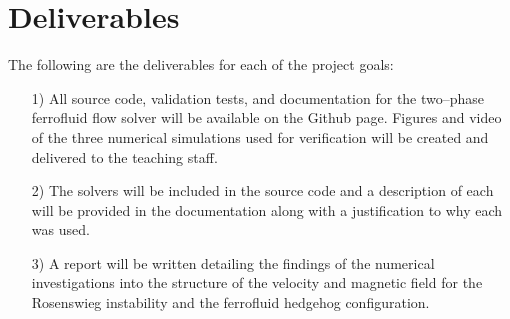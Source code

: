 \documentclass[11pt,fullpage]{article}
\theoremstyle{lemma}
\theoremstyle{definition}
\theoremstyle{lemma}
\begin{document}
\section{Deliverables}
The following are the deliverables for each of the project goals:
\begin{itemize}
	\item[1)] All source code, validation tests, and documentation for the two--phase ferrofluid flow solver will be available on the Github page. Figures and video of the three numerical simulations used for verification will be created and delivered to the teaching staff. 
	
	\item[2)] The solvers will be included in the source code and a description of each will be provided in the documentation along with a justification to why each was used.
	
	\item[3)] A report will be written detailing the findings of the numerical investigations into the structure of the velocity and magnetic field for the Rosenswieg instability and the ferrofluid hedgehog configuration.
\end{itemize}
\end{document}
